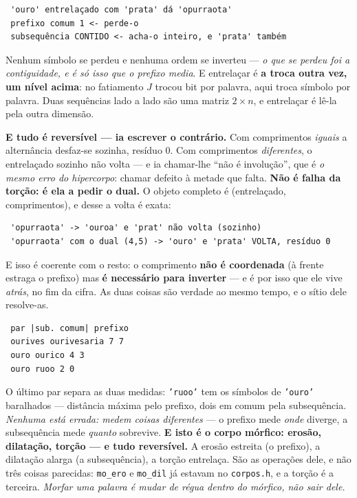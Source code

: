 \documentclass[11pt]{article}
\newcommand{\code}[1]{\texttt{\small #1}}
\theoremstyle{plain}
\theoremstyle{remark}
\begin{document}
\begin{itemize}
\begin{verbatim}
 'ouro' entrelaçado com 'prata' dá 'opurraota'
 prefixo comum 1 <- perde-o
 subsequência CONTIDO <- acha-o inteiro, e 'prata' também
\end{verbatim}

Nenhum símbolo se perdeu e nenhuma ordem se inverteu --- \emph{o que se perdeu foi a contiguidade,
e é só isso que o prefixo media}. E entrelaçar é \textbf{a troca outra vez, um nível acima}: no
fatiamento $J$ trocou bit por palavra, aqui troca símbolo por palavra. Duas sequências lado a lado
são uma matriz $2\times n$, e entrelaçar é lê-la pela outra dimensão.

\textbf{E tudo é reversível --- ia escrever o contrário.} Com comprimentos \emph{iguais} a
alternância desfaz-se sozinha, resíduo $0$. Com comprimentos \emph{diferentes}, o entrelaçado
sozinho não volta --- e ia chamar-lhe ``não é involução'', que é \emph{o mesmo erro do
hipercorpo}: chamar defeito à metade que falta. \textbf{Não é falha da torção: é ela a pedir o
dual.} O objeto completo é (entrelaçado, comprimentos), e desse a volta é exata:

\begin{verbatim}
 'opurraota' -> 'ouroa' e 'prat' não volta (sozinho)
 'opurraota' com o dual (4,5) -> 'ouro' e 'prata' VOLTA, resíduo 0
\end{verbatim}

E isso é coerente com o resto: o comprimento \textbf{não é coordenada} (à frente estraga o
prefixo) mas \textbf{é necessário para inverter} --- e é por isso que ele vive \emph{atrás}, no fim
da cifra. As duas coisas são verdade ao mesmo tempo, e o sítio dele resolve-as.

\begin{verbatim}
 par |sub. comum| prefixo
 ourives ourivesaria 7 7
 ouro ourico 4 3
 ouro ruoo 2 0
\end{verbatim}

O último par separa as duas medidas: \code{'ruoo'} tem os símbolos de \code{'ouro'} baralhados ---
distância máxima pelo prefixo, dois em comum pela subsequência. \emph{Nenhuma está errada: medem
coisas diferentes} --- o prefixo mede \emph{onde} diverge, a subsequência mede \emph{quanto}
sobrevive. \textbf{E isto é o corpo mórfico: erosão, dilatação, torção --- e tudo reversível.} A erosão
estreita (o prefixo), a dilatação alarga (a subsequência), a torção entrelaça. São as operações
dele, e não três coisas parecidas: \code{mo\_ero} e \code{mo\_dil} já estavam no \code{corpos.h}, e
a torção é a terceira. \emph{Morfar uma palavra é mudar de régua dentro do mórfico, não sair dele.}


\end{itemize}
\end{document}
